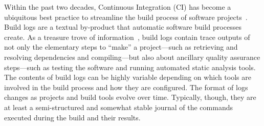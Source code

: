 





Within the past two decades, Continuous Integration (CI) has become a
ubiquitous best practice to streamline the build process of software
projects~\cite{hilton2016usage,beller2017oops,staahl2014modeling}.
Build logs are a textual by-product that automatic software build
processes create.
As a treasure trove of information~\cite{meyer},
build logs contain trace outputs of not only the elementary steps to
``make'' a project---such as retrieving and resolving dependencies and
compiling---but also about ancillary quality assurance steps---such as
testing the software and running automated static analysis tools.
The
contents of build logs can be highly variable depending on which tools
are involved in the build process and how they are
configured.
The format of logs changes as projects and build tools evolve over time.
Typically, though, they are at least a semi-structured and
somewhat stable journal of the commands executed during the build and
their results.


